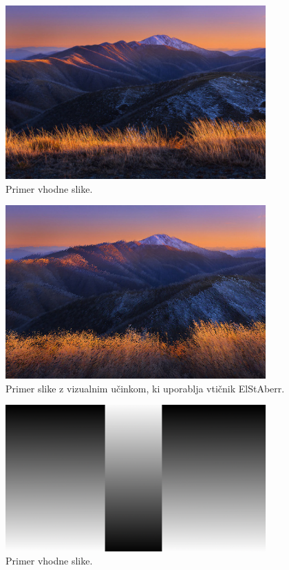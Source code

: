 \documentclass[a4paper, 12pt]{book}
\begin{document}
\begin{figure}[H]
\begin{center}
\includegraphics[width=10cm]{img/hills2.PNG}
\end{center}
\caption{Primer vhodne slike.}
\label{orig1}
\end{figure}

\begin{figure}[H]
\begin{center}
\includegraphics[width=10cm]{img/hills2ELSTABERR.PNG}
\end{center}
\caption{Primer slike z vizualnim učinkom, ki uporablja vtičnik ElStAberr.}
\label{demo1}
\end{figure}


\begin{figure}[H]
\begin{center}
\includegraphics[width=10cm]{img/test2.PNG}
\end{center}
\caption{Primer vhodne slike.}
\label{orig1}
\end{figure}
\end{document}
